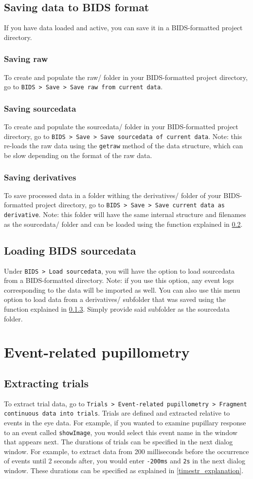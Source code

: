 \documentclass{article}
\newcommand{\erp}{Trials > Event-related pupillometry }
\begin{document}
\subsection{Saving data to BIDS format}
If you have data loaded and active, you can save it in a BIDS-formatted project directory.
\subsubsection{Saving raw}
To create and populate the raw/ folder in your BIDS-formatted project directory, go to \texttt{BIDS > Save > Save raw from current data}.
\subsubsection{Saving sourcedata}
To create and populate the sourcedata/ folder in your BIDS-formatted project directory, go to \texttt{BIDS > Save > Save sourcedata of current data}. Note: this re-loads the raw data using the \texttt{getraw} method of the data structure, which can be slow depending on the format of the raw data.
\subsubsection{Saving derivatives} \label{saving_derivatives}
To save processed data in a folder withing the derivatives/ folder of your BIDS-formatted project directory, go to \texttt{BIDS > Save > Save current data as derivative}. Note: this folder will have the same internal structure and filenames as the sourcedata/ folder and can be loaded using the function explained in \ref{load_sourcedata}.
\subsection{Loading BIDS sourcedata} \label{load_sourcedata}
Under \texttt{BIDS > Load sourcedata}, you will have the option to load sourcedata from a BIDS-formatted directory. Note: if you use this option, any event logs corresponding to the data will be imported as well. You can also use this menu option to load data from a derivatives/ subfolder that was saved using the function explained in \ref{saving_derivatives}. Simply provide said subfolder as the sourcedata folder.
\section{Event-related pupillometry}
\subsection{Extracting trials}
To extract trial data, go to \texttt{\erp > Fragment continuous data into trials}. Trials are defined and extracted relative to events in the eye data. For example, if you wanted to examine pupillary response to an event called \texttt{showImage}, you would select this event name in the window that appears next. The durations of trials can be specified in the next dialog window. For example, to extract data from 200 milliseconds before the occurrence of events until 2 seconds after, you would enter \texttt{-200ms} and \texttt{2s} in the next dialog window. These durations can be specified as explained in \ref{timestr_explanation}.
\end{document}

